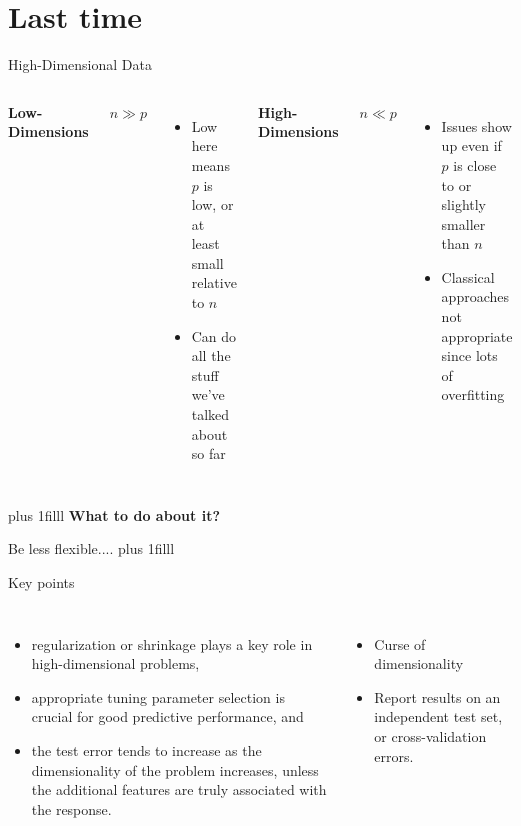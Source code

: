 \documentclass[aspectratio=169,usenames,dvipsnames]{beamer}
\newcommand{\bvfill}{\vskip0pt plus 1filll}
\begin{document}
\section{Last time}



\begin{frame}[t]{High-Dimensional Data}

\begin{columns}
\centering
\textbf{Low-Dimensions}

$n \gg p$

\footnotesize
\begin{itemize}
\item Low here means $p$ is low, or at least small relative to $n$
\item Can do all the stuff we've talked about so far
\end{itemize}
\centering
\textbf{High-Dimensions}

$n \ll p$

\footnotesize
\begin{itemize}
	\item Issues show up even if $p$ is close to or slightly smaller than $n$
	\item Classical approaches not appropriate since lots of overfitting
\end{itemize}



\end{columns}
\bvfill
\centering
\textbf{What to do about it?}

Be less flexible....
\bvfill
\end{frame}


\begin{frame}[t]{Key points }

\begin{columns}
\centering

\begin{itemize}
  \item regularization
or shrinkage plays a key role in high-dimensional problems, \item  appropriate
tuning parameter selection is crucial for good predictive performance, and
\item  the test error tends to increase as the dimensionality of the problem increases, unless the additional
features are truly associated with the response.
\end{itemize}

\centering
\begin{itemize}
	\item Curse of dimensionality
  \item Report results on an independent test set, or cross-validation errors.
\end{itemize}
\end{columns}

\end{frame}
\end{document}
